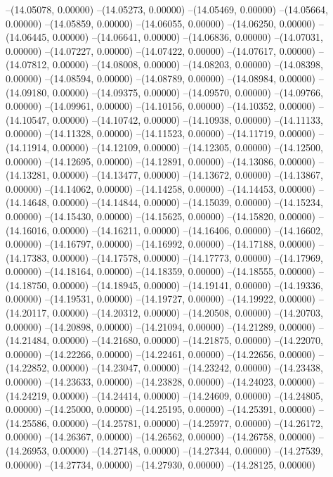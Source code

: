 --(14.05078, 0.00000)
--(14.05273, 0.00000)
--(14.05469, 0.00000)
--(14.05664, 0.00000)
--(14.05859, 0.00000)
--(14.06055, 0.00000)
--(14.06250, 0.00000)
--(14.06445, 0.00000)
--(14.06641, 0.00000)
--(14.06836, 0.00000)
--(14.07031, 0.00000)
--(14.07227, 0.00000)
--(14.07422, 0.00000)
--(14.07617, 0.00000)
--(14.07812, 0.00000)
--(14.08008, 0.00000)
--(14.08203, 0.00000)
--(14.08398, 0.00000)
--(14.08594, 0.00000)
--(14.08789, 0.00000)
--(14.08984, 0.00000)
--(14.09180, 0.00000)
--(14.09375, 0.00000)
--(14.09570, 0.00000)
--(14.09766, 0.00000)
--(14.09961, 0.00000)
--(14.10156, 0.00000)
--(14.10352, 0.00000)
--(14.10547, 0.00000)
--(14.10742, 0.00000)
--(14.10938, 0.00000)
--(14.11133, 0.00000)
--(14.11328, 0.00000)
--(14.11523, 0.00000)
--(14.11719, 0.00000)
--(14.11914, 0.00000)
--(14.12109, 0.00000)
--(14.12305, 0.00000)
--(14.12500, 0.00000)
--(14.12695, 0.00000)
--(14.12891, 0.00000)
--(14.13086, 0.00000)
--(14.13281, 0.00000)
--(14.13477, 0.00000)
--(14.13672, 0.00000)
--(14.13867, 0.00000)
--(14.14062, 0.00000)
--(14.14258, 0.00000)
--(14.14453, 0.00000)
--(14.14648, 0.00000)
--(14.14844, 0.00000)
--(14.15039, 0.00000)
--(14.15234, 0.00000)
--(14.15430, 0.00000)
--(14.15625, 0.00000)
--(14.15820, 0.00000)
--(14.16016, 0.00000)
--(14.16211, 0.00000)
--(14.16406, 0.00000)
--(14.16602, 0.00000)
--(14.16797, 0.00000)
--(14.16992, 0.00000)
--(14.17188, 0.00000)
--(14.17383, 0.00000)
--(14.17578, 0.00000)
--(14.17773, 0.00000)
--(14.17969, 0.00000)
--(14.18164, 0.00000)
--(14.18359, 0.00000)
--(14.18555, 0.00000)
--(14.18750, 0.00000)
--(14.18945, 0.00000)
--(14.19141, 0.00000)
--(14.19336, 0.00000)
--(14.19531, 0.00000)
--(14.19727, 0.00000)
--(14.19922, 0.00000)
--(14.20117, 0.00000)
--(14.20312, 0.00000)
--(14.20508, 0.00000)
--(14.20703, 0.00000)
--(14.20898, 0.00000)
--(14.21094, 0.00000)
--(14.21289, 0.00000)
--(14.21484, 0.00000)
--(14.21680, 0.00000)
--(14.21875, 0.00000)
--(14.22070, 0.00000)
--(14.22266, 0.00000)
--(14.22461, 0.00000)
--(14.22656, 0.00000)
--(14.22852, 0.00000)
--(14.23047, 0.00000)
--(14.23242, 0.00000)
--(14.23438, 0.00000)
--(14.23633, 0.00000)
--(14.23828, 0.00000)
--(14.24023, 0.00000)
--(14.24219, 0.00000)
--(14.24414, 0.00000)
--(14.24609, 0.00000)
--(14.24805, 0.00000)
--(14.25000, 0.00000)
--(14.25195, 0.00000)
--(14.25391, 0.00000)
--(14.25586, 0.00000)
--(14.25781, 0.00000)
--(14.25977, 0.00000)
--(14.26172, 0.00000)
--(14.26367, 0.00000)
--(14.26562, 0.00000)
--(14.26758, 0.00000)
--(14.26953, 0.00000)
--(14.27148, 0.00000)
--(14.27344, 0.00000)
--(14.27539, 0.00000)
--(14.27734, 0.00000)
--(14.27930, 0.00000)
--(14.28125, 0.00000)
